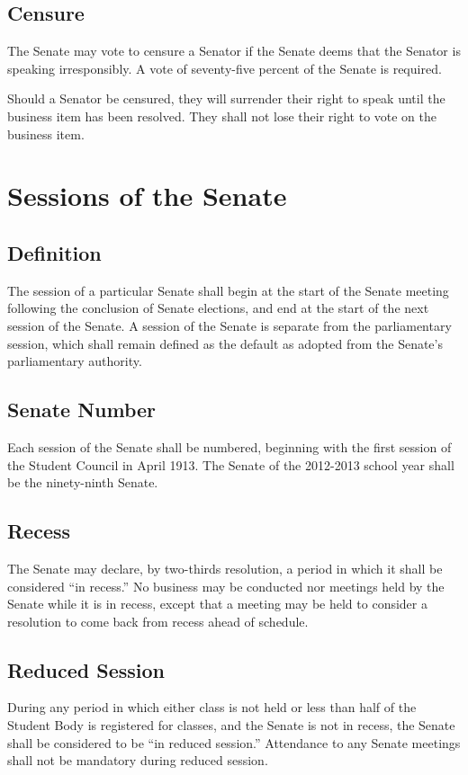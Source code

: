 \documentclass[12pt]{scrreprt}
\begin{document}
\subsection{Censure}
The Senate may vote to censure a Senator if the Senate deems that the Senator is speaking irresponsibly. A vote of seventy-five percent of the Senate is required. 

Should a Senator be censured, they will surrender their right to speak until the business item has been resolved. They shall not lose their right to vote on the business item. 

\section{Sessions of the Senate} \label{sec:senate_sessions}

\subsection{Definition}
The session of a particular Senate shall begin at the start of the Senate 
meeting following the conclusion of Senate elections, and end at the start of 
the next session of the Senate. A session of the Senate is separate from the
parliamentary session, which shall remain defined as the default as adopted
from the Senate’s parliamentary authority.

\subsection{Senate Number}
Each session of the Senate shall be numbered, beginning with the first session 
of the Student Council in April 1913. The Senate of the 2012-2013 school year 
shall be the ninety-ninth Senate. 

\subsection{Recess}
The Senate may declare, by two-thirds resolution, a period in which it shall 
be considered ``in recess.'' No business may be conducted nor meetings held by 
the Senate while it is in recess, except that a meeting may be held to 
consider a resolution to come back from recess ahead of schedule. 

\subsection{Reduced Session}
During any period in which either class is not held or less than half of the 
Student Body is registered for classes, and the Senate is not in recess, the 
Senate shall be considered to be ``in reduced session.'' Attendance to any 
Senate meetings shall not be mandatory during reduced session. 
\end{document}
